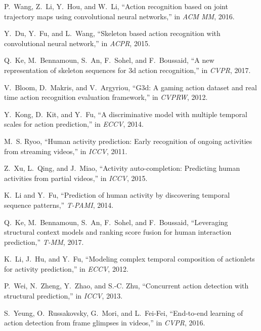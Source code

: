 \documentclass[10pt,twocolumn,letterpaper]{article}
\begin{document}
\begin{thebibliography}{10}
   P.~Wang, Z.~Li, Y.~Hou, and W.~Li, ``Action recognition based on joint
     trajectory maps using convolutional neural networks,'' in \emph{ACM MM},
     2016.
   
   Y.~Du, Y.~Fu, and L.~Wang, ``Skeleton based action recognition with
     convolutional neural network,'' in \emph{ACPR}, 2015.
   
   Q.~Ke, M.~Bennamoun, S.~An, F.~Sohel, and F.~Boussaid, ``A new representation
     of skeleton sequences for 3d action recognition,'' in \emph{CVPR}, 2017.
   
   V.~Bloom, D.~Makris, and V.~Argyriou, ``G3d: A gaming action dataset and real
     time action recognition evaluation framework,'' in \emph{CVPRW}, 2012.
   
   Y.~Kong, D.~Kit, and Y.~Fu, ``A discriminative model with multiple temporal
     scales for action prediction,'' in \emph{ECCV}, 2014.
   
   M.~S. Ryoo, ``Human activity prediction: Early recognition of ongoing
     activities from streaming videos,'' in \emph{ICCV}, 2011.
   
   Z.~Xu, L.~Qing, and J.~Miao, ``Activity auto-completion: Predicting human
     activities from partial videos,'' in \emph{ICCV}, 2015.
   
   K.~Li and Y.~Fu, ``Prediction of human activity by discovering temporal
     sequence patterns,'' \emph{T-PAMI}, 2014.
   
   Q.~Ke, M.~Bennamoun, S.~An, F.~Sohel, and F.~Boussaid, ``Leveraging structural
     context models and ranking score fusion for human interaction prediction,''
     \emph{T-MM}, 2017.
   
   K.~Li, J.~Hu, and Y.~Fu, ``Modeling complex temporal composition of actionlets
     for activity prediction,'' in \emph{ECCV}, 2012.
   
   P.~Wei, N.~Zheng, Y.~Zhao, and S.-C. Zhu, ``Concurrent action detection with
     structural prediction,'' in \emph{ICCV}, 2013.
   
   S.~Yeung, O.~Russakovsky, G.~Mori, and L.~Fei-Fei, ``End-to-end learning of
     action detection from frame glimpses in videos,'' in \emph{CVPR}, 2016.
   

\end{thebibliography}
\end{document}
